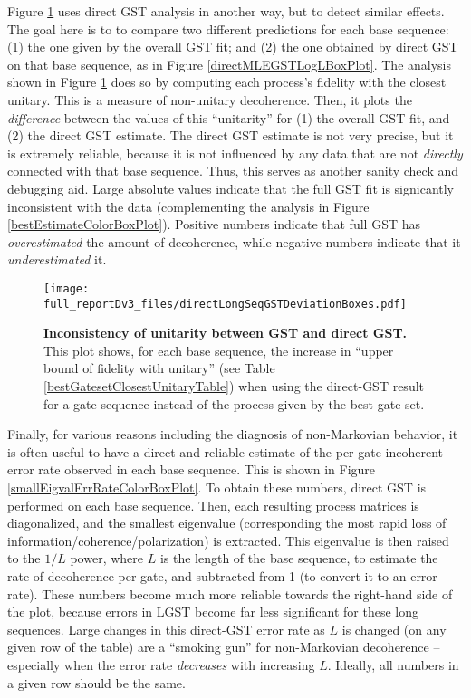 {Figure \ref{directMLEGSTDeviationBoxPlot} uses direct GST analysis in another way, but to detect similar effects.   The goal here is to to compare two different predictions for each base sequence:  (1) the one given by the overall GST fit; and (2) the one obtained by direct GST on that base sequence, as in Figure \ref{directMLEGSTLogLBoxPlot}.  The analysis shown in Figure \ref{directMLEGSTDeviationBoxPlot} does so by computing each process's fidelity with the closest unitary.  This is a measure of non-unitary decoherence.  Then, it plots the \emph{difference} between the values of this ``unitarity'' for (1) the overall GST fit, and (2) the direct GST estimate.  The direct GST estimate is not very precise, but it is extremely reliable, because it is not influenced by any data that are not \emph{directly} connected with that base sequence.  Thus, this serves as another sanity check and debugging aid.  Large absolute values indicate that the full GST fit is signicantly inconsistent with the data (complementing the analysis in Figure \ref{bestEstimateColorBoxPlot}).  Positive numbers indicate that full GST has \emph{overestimated} the amount of decoherence, while negative numbers indicate that it \emph{underestimated} it.

\begin{figure}
\begin{center}
\texttt{[image: full\_reportDv3\_files/directLongSeqGSTDeviationBoxes.pdf]}
\caption{\textbf{Inconsistency of unitarity between GST and direct GST.}  This plot shows, for each base sequence, the increase in ``upper bound of fidelity with unitary'' (see Table \ref{bestGatesetClosestUnitaryTable}) when using the direct-GST result for a gate sequence instead of the process given by the best gate set.\label{directMLEGSTDeviationBoxPlot}}
\end{center}
\end{figure}

Finally, for various reasons including the diagnosis of non-Markovian behavior, it is often useful to have a direct and reliable estimate of the per-gate incoherent error rate observed in each base sequence.  This is shown in Figure \ref{smallEigvalErrRateColorBoxPlot}.  To obtain these numbers, direct GST is performed on each base sequence.  Then, each resulting process matrices is diagonalized, and the smallest eigenvalue (corresponding the most rapid loss of information/coherence/polarization) is extracted.  This eigenvalue is then raised to the $1/L$ power, where $L$ is the length of the base sequence, to estimate the rate of decoherence per gate, and subtracted from 1 (to convert it to an error rate).  These numbers become much more reliable towards the right-hand side of the plot, because errors in LGST become far less significant for these long sequences.  Large changes in this direct-GST error rate as $L$ is changed (on any given row of the table) are a ``smoking gun'' for non-Markovian decoherence -- especially when the error rate \emph{decreases} with increasing $L$.  Ideally, all numbers in a given row should be the same.

}
